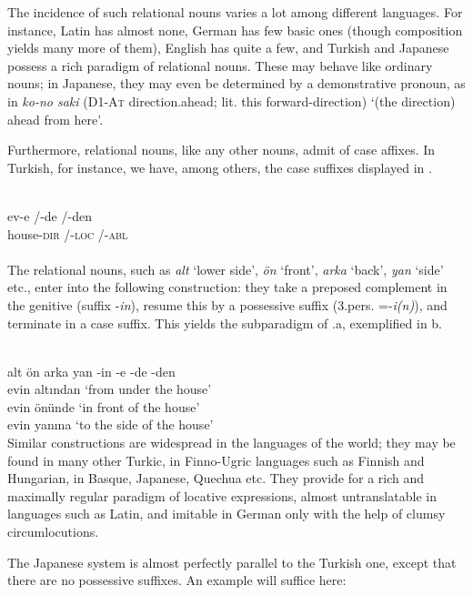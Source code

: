 The incidence of such relational nouns varies a lot among different languages. For instance, Latin has almost none, German has few basic ones (though composition yields many more of them), English has quite a few, and Turkish and Japanese possess a rich paradigm of relational nouns. These may behave like ordinary nouns; in Japanese, they may even be determined by a demonstrative pronoun, as in \textit{ko-no saki} (D1-\textsc{At} direction.ahead; lit. this forward-direction) ‘(the direction) ahead from here’.

Furthermore, relational nouns, like any other nouns, admit of case affixes. In Turkish, for instance, we have, among others, the case suffixes displayed in .

\ea\label{ex:E49}
\langinfo{\LangTurk}{}{}\\
\gll   ev-e  /-de  /-den\\
 house-\textsc{dir}  /-\textsc{loc}  /-\textsc{abl}\\
\\
\z
\noindent The relational nouns, such as \textit{alt} ‘lower side’, \textit{ön} ‘front’, \textit{arka} ‘back’, \textit{yan} ‘side’ etc., enter into the following construction: they take a preposed complement in the genitive (suffix -\textit{in}), resume this by a possessive suffix (3.pers. =-\textit{i(n)}), and terminate in a case suffix. This yields the subparadigm of .a, exemplified in b.

\ea\label{ex:E50}
  \\
   {}  alt ön arka yan   {{}-in}  {}   {{}-e {}-de {}-den} \\
\ex  evin altından  ‘from under the house’\\
\ex evin önünde  ‘in front of the house’\\
\ex evin yanına  ‘to the side of the house’ \\
\z
\z
\noindent Similar constructions are widespread in the languages of the world; they may be found in many other Turkic, in Finno-Ugric languages such as Finnish and Hungarian, in Basque, Japanese, Quechua etc. They provide for a rich and maximally regular paradigm of locative expressions, almost untranslatable in languages such as Latin, and imitable in German only with the help of clumsy circumlocutions.

The Japanese system is almost perfectly parallel to the Turkish one, except that there are no possessive suffixes. An example will suffice here:

